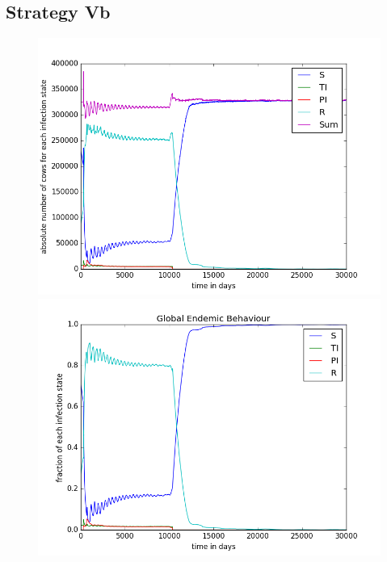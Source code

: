 \subsection{Strategy Vb}

\begin{figure}[htbp]
\begin{minipage}{0.5\textwidth}
\centering
\noindent\includegraphics[width=0.95\linewidth,height=\textheight,
keepaspectratio]{cont5btotalEndemicNumbers.png} 
\end{minipage}
\begin{minipage}{0.5\textwidth}
\centering
\noindent\includegraphics[width=0.95\linewidth,height=\textheight,
keepaspectratio]{cont5bendemicFractions.png} 
\end{minipage}
\caption[Endemic Behavior in Containment Strategy One]{}
\label{fig:demographyScen8}
\end{figure}

